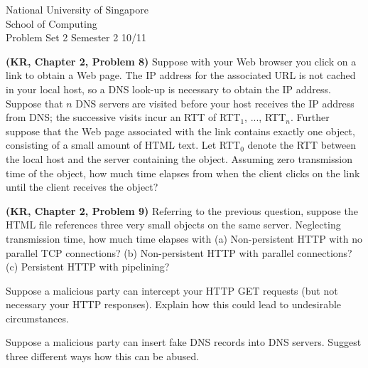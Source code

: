 \documentclass[a4paper,11pt]{exam}
\begin{document}
\extraheadheight{.5in}
%
{\large\sf National University of Singapore\\ School of Computing \\
\LARGE\sf Problem Set 2}%
{\large\sf Semester 2 10/11}
\firstpageheadrule
\pagestyle{headandfoot}

\begin{questions}

\question \textbf{(KR, Chapter 2, Problem 8)}
Suppose with your Web browser you click on a link to obtain a
Web page.  The IP address for the associated URL is not cached
in your local host, so a DNS look-up is necessary to obtain the
IP address.  Suppose that $n$ DNS servers are visited before your
host receives the IP address from DNS; the successive visits
incur an RTT of RTT$_1$, ..., RTT$_n$.  Further suppose that
the Web page associated with the link contains exactly one
object, consisting of a small amount of HTML text.  Let RTT$_0$
denote the RTT between the local host and the server containing
the object.  Assuming zero transmission time of the object, how
much time elapses from when the client clicks on the link until
the client receives the object?

\question \textbf{(KR, Chapter 2, Problem 9)}
Referring to the previous question, suppose the HTML file
references three very small objects on the same server.
Neglecting transmission time, how much time elapses with (a)
Non-persistent HTTP with no parallel TCP connections? (b)
Non-persistent HTTP with parallel connections? (c) Persistent
HTTP with pipelining?

\question 
Suppose a malicious party can intercept your HTTP GET requests (but not necessary your HTTP responses).  Explain how this could lead to undesirable circumstances.

\question
Suppose a malicious party can insert fake DNS records into DNS servers.  Suggest three different ways how this can be abused.

\end{questions}
\end{document}
